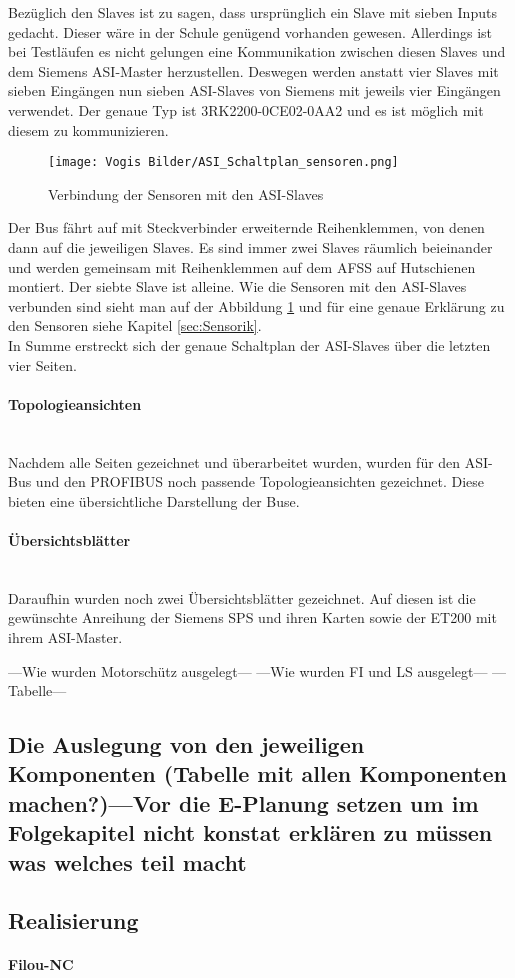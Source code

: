     Bezüglich den Slaves ist zu sagen, dass ursprünglich ein Slave mit sieben Inputs gedacht. Dieser wäre in der Schule genügend vorhanden gewesen. Allerdings ist bei Testläufen es nicht gelungen eine Kommunikation zwischen diesen Slaves und dem Siemens ASI-Master herzustellen. Deswegen werden anstatt vier Slaves mit sieben Eingängen nun sieben ASI-Slaves von Siemens mit jeweils vier Eingängen verwendet. Der genaue Typ ist 3RK2200-0CE02-0AA2 und es ist möglich mit diesem zu kommunizieren.\\
    \begin{figure}[h]
        \centering
        \texttt{[image: Vogis Bilder/ASI\_Schaltplan\_sensoren.png]}
        \caption{Verbindung der Sensoren mit den ASI-Slaves}
        \label{fig:ASI_Sensoren}
    \end{figure}
    Der Bus fährt auf mit Steckverbinder erweiternde Reihenklemmen, von denen dann auf die jeweiligen Slaves. Es sind immer zwei Slaves räumlich beieinander und werden gemeinsam mit Reihenklemmen auf dem AFSS auf Hutschienen montiert. Der siebte Slave ist alleine. Wie die Sensoren mit den ASI-Slaves verbunden sind sieht man auf der Abbildung \ref{fig:ASI_Sensoren} und für eine genaue Erklärung zu den Sensoren siehe Kapitel \ref{sec:Sensorik}.\\
    In Summe erstreckt sich der genaue Schaltplan der ASI-Slaves über die letzten vier Seiten.
    \paragraph{Topologieansichten}\mbox{}\\
    Nachdem alle Seiten gezeichnet und überarbeitet wurden, wurden für den ASI-Bus und den PROFIBUS noch passende Topologieansichten gezeichnet. Diese bieten eine übersichtliche Darstellung der Buse.
    \paragraph{Übersichtsblätter}\mbox{}\\
    Daraufhin wurden noch zwei Übersichtsblätter gezeichnet. Auf diesen ist die gewünschte Anreihung der Siemens SPS und ihren Karten sowie der ET200 mit ihrem ASI-Master.


    ---Wie wurden Motorschütz ausgelegt---
    ---Wie wurden FI und LS ausgelegt---
    ---Tabelle--- 
\subsection{Die Auslegung von den jeweiligen Komponenten (Tabelle mit allen Komponenten machen?)---Vor die E-Planung setzen um im Folgekapitel nicht konstat erklären zu müssen was welches teil macht}
\subsection{Realisierung}
    \paragraph{Filou-NC}\mbox{}\\




